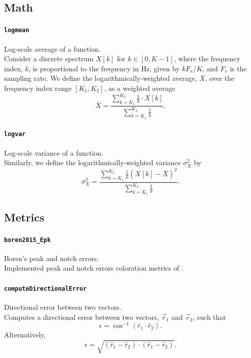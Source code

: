 \documentclass[11pt, oneside]{article}
\newcommand{\function}[1]{\paragraph*{\texttt{#1}}}
\begin{document}
\subsection{Math}

\function{logmean} Log-scale average of a function. \\
Consider a discrete spectrum $X[k]$ for $k \in [0, K-1]$, where the frequency index, $k$, is proportional to the frequency in Hz, given by $k F_s/K$, and $F_s$ is the sampling rate.
We define the logarithmically-weighted average, $\overline{X}$, over the frequency index range $[K_1, K_2]$, as a weighted average
\begin{equation}\label{eq:logmean}
\overline{X} = \frac{\displaystyle \sum_{k=K_1}^{K_2} \frac{1}{k} \cdot X[k]}{\displaystyle \sum_{k=K_1}^{K_2} \frac{1}{k}}.
\end{equation}

\function{logvar} Log-scale variance of a function. \\
Similarly, we define the logarithmically-weighted variance $\sigma_X^2$ by
\begin{equation}\label{eq:logvar}
\sigma_X^2 = \frac{\displaystyle \sum_{k=K_1}^{K_2} \frac{1}{k} \left( X[k] - \overline{X} \right)^2}{\displaystyle \sum_{k=K_1}^{K_2} \frac{1}{k}}.
\end{equation}

\subsection{Metrics}

\function{boren2015\_Epk} Boren's peak and notch errors. \\
Implemented peak and notch errors coloration metrics of \citet{Boren2015}.

\function{computeDirectionalError} Directional error between two vectors. \\
Computes a directional error between two vectors, $\vec{r}_1$ and $\vec{r}_2$, such that
\begin{equation}
\epsilon = \cos^{-1} \left( \hat{r}_1 \cdot \hat{r}_2 \right).
\end{equation}
Alternatively,
\begin{equation}
\epsilon = \sqrt{ \left( \hat{r}_1 - \hat{r}_2 \right) \cdot \left( \hat{r}_1 - \hat{r}_2 \right) }.
\end{equation}
\end{document}
